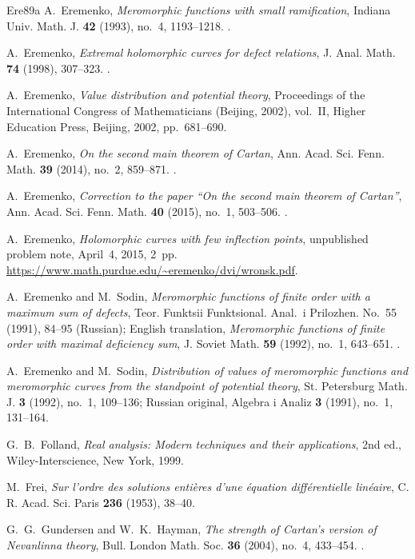 \documentclass[12pt,letterpaper,reqno]{amsart}
\theoremstyle{definition}
\numberwithin{equation}{section}
\begin{document}
\begin{thebibliography}{Ere89a}
A.~Eremenko,
\emph{Meromorphic functions with small ramification},
Indiana Univ. Math. J. \textbf{42} (1993), no.~4, 1193--1218.
.

A.~Eremenko,
\emph{Extremal holomorphic curves for defect relations},
J. Anal. Math. \textbf{74} (1998), 307--323.
.

A.~Eremenko,
\emph{Value distribution and potential theory},
Proceedings of the International Congress of Mathematicians
(Beijing, 2002), vol.~II, Higher Education Press, Beijing, 2002,
pp.~681--690.

A.~Eremenko,
\emph{On the second main theorem of Cartan},
Ann. Acad. Sci. Fenn. Math. \textbf{39} (2014), no.~2, 859--871.
.

A.~Eremenko,
\emph{Correction to the paper ``On the second main theorem of Cartan''},
Ann. Acad. Sci. Fenn. Math. \textbf{40} (2015), no.~1, 503--506.
.

A.~Eremenko,
\emph{Holomorphic curves with few inflection points},
unpublished problem note, April~4, 2015, 2~pp.
\url{https://www.math.purdue.edu/~eremenko/dvi/wronsk.pdf}.

A.~Eremenko and M.~Sodin,
\emph{Meromorphic functions of finite order with a maximum sum of defects},
Teor. Funktsii Funktsional. Anal.\ i Prilozhen. No.~55 (1991), 84--95
(Russian); English translation, \emph{Meromorphic functions of finite
order with maximal deficiency sum}, J. Soviet Math. \textbf{59} (1992),
no.~1, 643--651.
.

A.~Eremenko and M.~Sodin,
\emph{Distribution of values of meromorphic functions and meromorphic
curves from the standpoint of potential theory},
St. Petersburg Math. J. \textbf{3} (1992), no.~1, 109--136;
Russian original, Algebra i Analiz \textbf{3} (1991), no.~1, 131--164.

G.~B.~Folland,
\emph{Real analysis: Modern techniques and their applications},
2nd ed., Wiley-Interscience, New York, 1999.

M.~Frei,
\emph{Sur l'ordre des solutions enti\`eres d'une \'equation diff\'erentielle
lin\'eaire},
C. R. Acad. Sci. Paris \textbf{236} (1953), 38--40.

G.~G.~Gundersen and W.~K.~Hayman,
\emph{The strength of Cartan's version of Nevanlinna theory},
Bull. London Math. Soc. \textbf{36} (2004), no.~4, 433--454.
.


\end{thebibliography}
\end{document}
